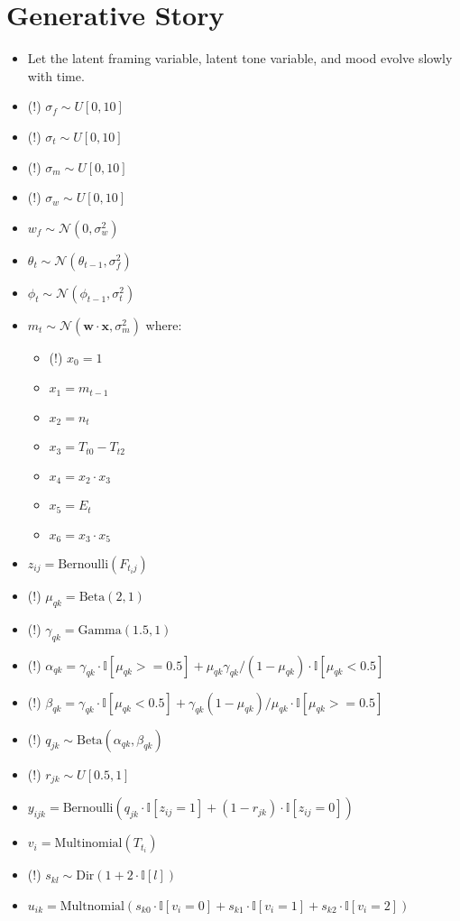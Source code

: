 \documentclass[11pt]{article}
\theoremstyle{plain}
\theoremstyle{definition}
\begin{document}
\section{Generative Story}

\begin{itemize}
\item Let the latent framing variable, latent tone variable, and mood evolve slowly with time.
\item (!) $\sigma_f \sim U[0, 10]$
\item (!) $\sigma_t \sim U[0, 10]$
\item (!) $\sigma_m \sim U[0, 10]$
\item (!) $\sigma_w \sim U[0, 10]$
\item $w_f \sim \mathcal{N}(0, \sigma_w^2)$
\item $\theta_t \sim \mathcal{N}(\theta_{t-1}, \sigma_f^2)$
\item $\phi_t \sim \mathcal{N}(\phi_{t-1}, \sigma_t^2)$
\item $m_t \sim \mathcal{N}(\mathbf{w} \cdot \mathbf{x}, \sigma_m^2)$ where:
\begin{itemize}
\item (!) $x_0 = 1$
\item $x_1 = m_{t-1}$
\item $x_2 = n_t$
\item $x_3 = T_{t0} - T_{t2}$
\item $x_4 = x_2 \cdot x_3$
\item $x_5 = E_t$
\item $x_6 = x_3 \cdot x_5$
\end{itemize}
\item $z_{ij} = \textrm{Bernoulli}(F_{t_i j})$
\item (!) $\mu_{qk} = \textrm{Beta}(2,1)$
\item (!) $\gamma_{qk} = \textrm{Gamma}(1.5,1)$
\item (!) $\alpha_{qk} = \gamma_{qk} \cdot \mathbb{I}[\mu_{qk} >= 0.5] + \mu_{qk} \gamma_{qk} / (1 - \mu_{qk}) \cdot \mathbb{I}[\mu_{qk} < 0.5]$
\item (!) $\beta_{qk} = \gamma_{qk} \cdot \mathbb{I}[\mu_{qk} < 0.5] + \gamma_{qk} (1 - \mu_{qk} ) / \mu_{qk} \cdot \mathbb{I}[\mu_{qk} >= 0.5]$
\item (!) $q_{jk} \sim \textrm{Beta}(\alpha_{qk}, \beta_{qk})$
\item (!) $r_{jk} \sim U[0.5, 1]$
\item $y_{ijk} = \textrm{Bernoulli}\left( q_{jk} \cdot \mathbb{I}[{z_{ij}}=1] + (1-r_{jk}) \cdot \mathbb{I}[z_{ij} = 0]\right)$
\item $v_{i} = \textrm{Multinomial}(T_{t_i})$
\item (!) $s_{kl} \sim \textrm{Dir}(1 + 2 \cdot \mathbb{I}[l])$
\item $u_{ik} = \textrm{Multnomial}(s_{k0} \cdot \mathbb{I}[v_i = 0] + s_{k1} \cdot \mathbb{I}[v_i = 1] + s_{k2} \cdot \mathbb{I}[v_i = 2]) $

\end{itemize}
\end{document}

